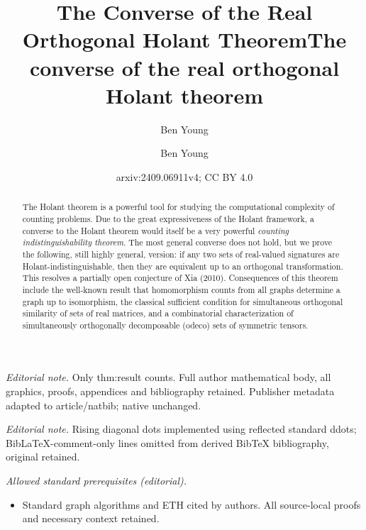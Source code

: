 \documentclass{article}
\author{Ben Young}\date{}
\title{The Converse of the Real Orthogonal Holant Theorem}
\title{The converse of the real orthogonal Holant theorem}
\author{Ben Young}
\date{arxiv:2409.06911v4; CC BY 4.0}
\begin{document}
\maketitle
\noindent\textit{Editorial note.} Only thm:result counts. Full author mathematical body, all graphics, proofs, appendices and bibliography retained. Publisher metadata adapted to article/natbib; native unchanged.\par\medskip
\noindent\textit{Editorial note.} Rising diagonal dots implemented using reflected standard ddots; BibLaTeX-comment-only lines omitted from derived BibTeX bibliography, original retained.\par\medskip
\noindent\textit{Allowed standard prerequisites (editorial).}\begin{itemize}
\item Standard graph algorithms and ETH cited by authors. All source-local proofs and necessary context retained.
\end{itemize}\medskip
\maketitle

\begin{abstract}
The Holant theorem is a powerful tool for studying the computational complexity of
counting problems. Due to the great expressiveness of the Holant framework,
a converse to the Holant theorem would itself be a very powerful 
\emph{counting indistinguishability theorem}. The most general converse does not hold, but we prove
the following, still highly general, version:
if any two sets of real-valued signatures are Holant-indistinguishable, then they are equivalent 
up to an orthogonal transformation. This resolves a partially open conjecture of Xia (2010).
Consequences of this theorem include the well-known result that homomorphism counts from all graphs
determine a graph up to isomorphism, the classical sufficient condition for simultaneous orthogonal
similarity of sets of real matrices,
and a combinatorial characterization of simultaneously orthogonally decomposable (odeco) sets of 
symmetric tensors.
\end{abstract}

\end{document}
